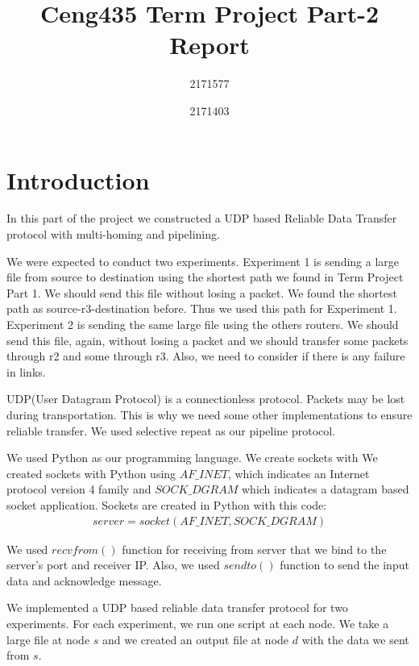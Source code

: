 \documentclass[conference]{IEEEtran}
\begin{document}
\title{Ceng435 Term Project Part-2 Report\\
}

\author{
2171577 \\ 
\and
{}
2171403
}

\maketitle


\section{Introduction}
In this part of the project we constructed a UDP based Reliable Data Transfer protocol with multi-homing and pipelining. 

We were expected to conduct two experiments. Experiment 1 is sending a large file from source to destination using the shortest path we found in Term Project Part 1. We should send this file without losing a packet. We found the shortest path as source-r3-destination before. Thus we used this path for Experiment 1. Experiment 2 is sending the same large file using the others routers. We should send this file, again, without losing a packet and we should transfer some packets through r2 and some through r3. Also, we need to consider if there is any failure in links.

UDP(User Datagram Protocol) is a connectionless protocol. Packets may be lost during transportation. This is why we need some other implementations to ensure reliable transfer. We used selective repeat as our pipeline protocol.


We used Python as our programming language. We create sockets with 
We created sockets with Python using $AF\_INET$, which indicates an Internet protocol version 4 family and $SOCK\_DGRAM$ which indicates a datagram based socket application. Sockets are created in Python with this code:
\begin{align*}
    server = socket(AF\_INET, SOCK\_DGRAM)
\end{align*}

We used $recvfrom()$ function for receiving from server that we bind to the server's port and receiver IP. Also, we used $sendto()$ function to send the input data and acknowledge message.

We implemented a UDP based reliable data transfer protocol for two experiments. For each experiment, we run one script at each node. We take a large file at node $s$ and we created an output file at node $d$ with the data we sent from $s$.
\end{document}
